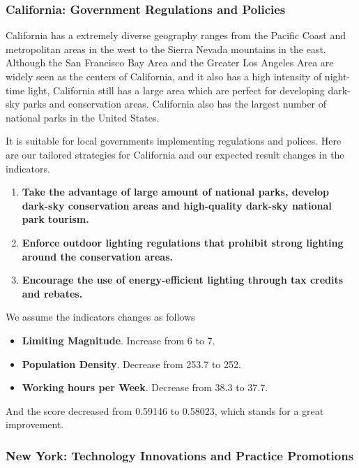 \subsubsection{California: Government Regulations and Policies}
California has a extremely diverse geography ranges from the Pacific Coast and metropolitan areas in the west to the Sierra Nevada mountains in the east. Although the San Francisco Bay Area and the Greater Los Angeles Area are widely seen as the centers of California, and it also has a high intensity of night-time light, California still has a large area which are perfect for developing dark-sky parks and conservation areas. California also has the largest number of national parks in the United States.

It is suitable for local governments implementing regulations and polices. Here are our tailored strategies for California and our expected result changes in the indicators.

\begin{enumerate}
    \item \textbf{Take the advantage of large amount of national parks, develop dark-sky conservation areas and high-quality dark-sky national park tourism.} 

    \item \textbf{Enforce outdoor lighting regulations that prohibit strong lighting around the conservation areas.}
    
    \item \textbf{Encourage the use of energy-efficient lighting through tax credits and rebates.}

\end{enumerate}

We assume the indicators changes as follows
\begin{itemize}
    \item \textbf{Limiting Magnitude}. Increase from 6 to 7.
    \item \textbf{Population Density}. Decrease from 253.7 to 252.
    \item \textbf{Working hours per Week}. Decrease from 38.3 to 37.7.
\end{itemize}

And the score decreased from 0.59146 to 0.58023, which stands for a great improvement.


\subsubsection{New York: Technology Innovations and Practice Promotions}

